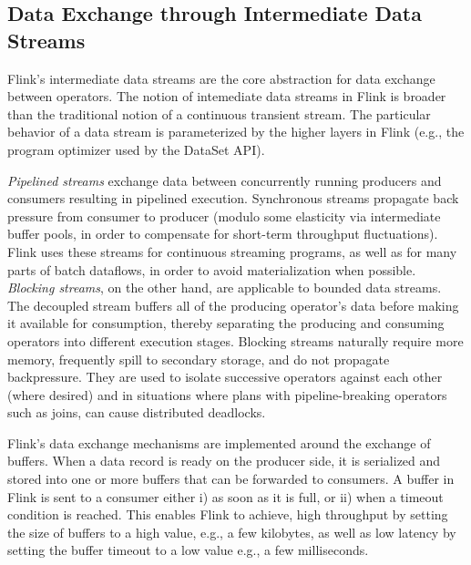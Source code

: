 \subsection{Data Exchange through Intermediate Data Streams}

Flink's intermediate data streams are the core abstraction for data exchange between operators. The notion of intemediate data streams in Flink is broader than the traditional notion of a continuous transient stream. The particular behavior of a data stream is parameterized by the higher layers in Flink (e.g., the program optimizer used by the DataSet API). 


 \emph{Pipelined streams} exchange data between concurrently running producers and consumers resulting in pipelined execution. Synchronous streams propagate back pressure from consumer to producer (modulo some elasticity via intermediate buffer pools, in order to compensate for short-term throughput fluctuations). Flink uses these streams for continuous streaming programs, as well as for many parts of batch dataflows, in order to avoid materialization when possible. \emph{Blocking streams}, on the other hand, are applicable to bounded data streams. The decoupled stream buffers all of the producing operator's data before making it available for consumption, thereby separating the producing and consuming operators into different execution stages. Blocking streams naturally require more memory, frequently spill to secondary storage, and do not propagate backpressure. They are used to isolate successive operators against each other (where desired) and in situations where plans with pipeline-breaking operators such as joins, can cause distributed deadlocks.

 Flink’s data exchange mechanisms are implemented around the exchange of buffers. When a data record is ready on the producer side, it is serialized and stored into one or more buffers that can be forwarded to consumers. A buffer in Flink is sent to a consumer either i) as soon as it is full, or ii) when a timeout condition is reached. This enables Flink to achieve, high throughput by setting the size of buffers to a high value, e.g., a few kilobytes, as well as low latency by setting the buffer timeout to a low value e.g., a few milliseconds.

